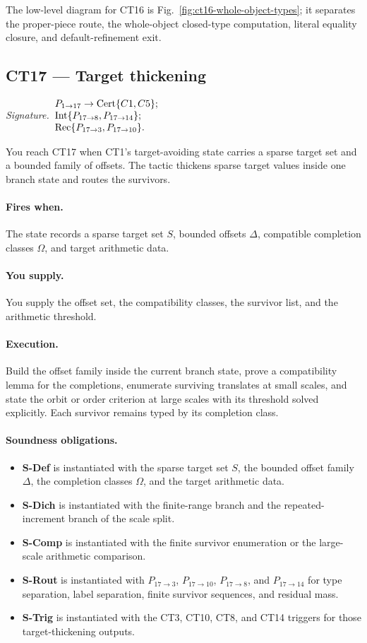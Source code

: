 \documentclass[
  11pt,
]{article}
\providecommand{\tightlist}{%
  \setlength{\itemsep}{0pt}\setlength{\parskip}{0pt}}
\theoremstyle{definition}
\newcommand{\ctsignature}[1]{\par\noindent\emph{Signature.}\ #1\par\medskip}
\newcommand{\ctcert}[1]{\mathrm{Cert}\{#1\}}
\newcommand{\ctint}[1]{\mathrm{Int}\{#1\}}
\newcommand{\ctrec}[1]{\mathrm{Rec}\{#1\}}
\newcommand{\ctpar}[1]{\paragraph{#1.}}
\begin{document}
The low-level diagram for CT16 is Fig.~\ref{fig:ct16-whole-object-types};
it separates the proper-piece route, the whole-object closed-type
computation, literal equality closure, and default-refinement exit.



\subsection{CT17 --- Target thickening}\label{ct:17}\label{target-thickening-bounded-offsets-against-sparse-targets}
\ctsignature{\(\begin{array}{@{}l@{}}
P_{1\to17}\to \ctcert{C1,C5};\\
\ctint{P_{17\to8},P_{17\to14}};\\
\ctrec{P_{17\to3},P_{17\to10}}.
\end{array}\)}

You reach CT17 when CT1's target-avoiding state carries a sparse target
set and a bounded family of offsets.  The tactic thickens sparse target
values inside one branch state and routes the survivors.

\ctpar{Fires when}
The state records a sparse target set \(S\), bounded offsets \(\Delta\),
compatible completion classes \(\Omega\), and target arithmetic data.

\ctpar{You supply}
You supply the offset set, the compatibility classes, the survivor list,
and the arithmetic threshold.

\ctpar{Execution}
Build the offset family inside the current branch state, prove a
compatibility lemma for the completions, enumerate surviving translates
at small scales, and state the orbit or order criterion at
large scales with its threshold solved explicitly.  Each survivor remains
typed by its completion class.

\ctpar{Soundness obligations}
\begin{itemize}
\tightlist
\item \textbf{S-Def} is instantiated with the sparse target set \(S\), the bounded offset family \(\Delta\), the completion classes \(\Omega\), and the target arithmetic data.
\item \textbf{S-Dich} is instantiated with the finite-range branch and the repeated-increment branch of the scale split.
\item \textbf{S-Comp} is instantiated with the finite survivor enumeration or the large-scale arithmetic comparison.
\item \textbf{S-Rout} is instantiated with \(P_{17\to3}\), \(P_{17\to10}\), \(P_{17\to8}\), and \(P_{17\to14}\) for type separation, label separation, finite survivor sequences, and residual mass.
\item \textbf{S-Trig} is instantiated with the CT3, CT10, CT8, and CT14 triggers for those target-thickening outputs.
\end{itemize}
\end{document}
